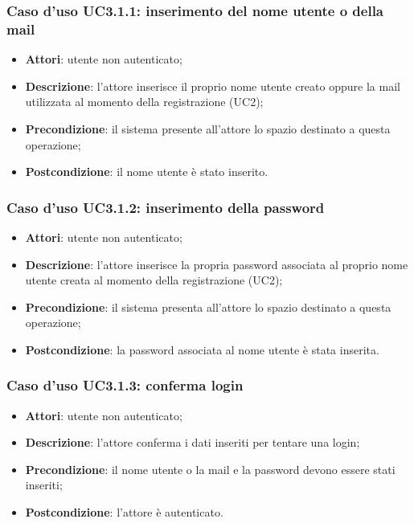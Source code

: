 \subsubsection{Caso d'uso UC3.1.1: inserimento del nome utente o della mail}
\begin{itemize}
	\item \textbf{Attori}: utente non autenticato;
	\item \textbf{Descrizione}: l'attore inserisce il proprio nome utente creato oppure la mail utilizzata al momento della registrazione (UC2);
	\item \textbf{Precondizione}: il sistema presente all'attore lo spazio destinato a questa operazione;
	\item \textbf{Postcondizione}: il nome utente è stato inserito.
\end{itemize}
\subsubsection{Caso d'uso UC3.1.2: inserimento della password}
\begin{itemize}
	\item \textbf{Attori}: utente non autenticato;
	\item \textbf{Descrizione}: l'attore inserisce la propria password associata al proprio nome utente creata al momento della registrazione (UC2);
	\item \textbf{Precondizione}: il sistema presenta all'attore lo spazio destinato a questa operazione;
	\item \textbf{Postcondizione}: la password associata al nome utente è stata inserita.
\end{itemize}
\subsubsection{Caso d'uso UC3.1.3: conferma login}
\begin{itemize}
	\item \textbf{Attori}: utente non autenticato;
	\item \textbf{Descrizione}: l'attore conferma i dati inseriti per tentare una login;
	\item \textbf{Precondizione}: il nome utente o la mail e la password devono essere stati inseriti;
	\item \textbf{Postcondizione}: l'attore è autenticato.
\end{itemize}
